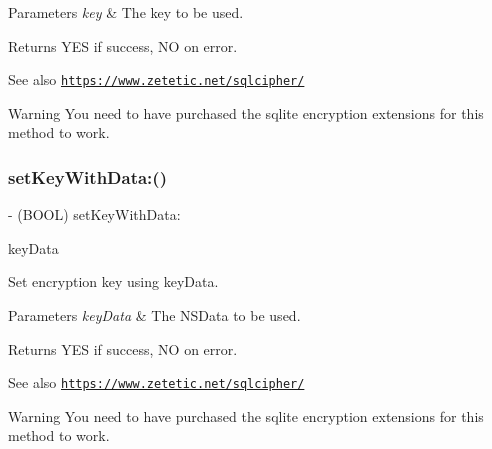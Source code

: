 \begin{DoxyParams}{Parameters}
{\em key} & The key to be used.\\
\hline
\end{DoxyParams}
\begin{DoxyReturn}{Returns}
{\ttfamily Y\+ES} if success, {\ttfamily NO} on error.
\end{DoxyReturn}
\begin{DoxySeeAlso}{See also}
\href{https://www.zetetic.net/sqlcipher/}{\tt https\+://www.\+zetetic.\+net/sqlcipher/}
\end{DoxySeeAlso}
\begin{DoxyWarning}{Warning}
You need to have purchased the sqlite encryption extensions for this method to work. 
\end{DoxyWarning}
\mbox{\label{interface_o_p_t_l_y_f_m_d_b_database_a7cbf561f5cbeae819eefdc0b873f1730}} 
\subsubsection{\texorpdfstring{set\+Key\+With\+Data\+:()}{setKeyWithData:()}}
{\footnotesize\ttfamily -\/ (B\+O\+OL) set\+Key\+With\+Data\+: \begin{DoxyParamCaption}\item[{(N\+S\+Data $\ast$)}]{key\+Data }\end{DoxyParamCaption}}

Set encryption key using {\ttfamily key\+Data}.


\begin{DoxyParams}{Parameters}
{\em key\+Data} & The {\ttfamily N\+S\+Data} to be used.\\
\hline
\end{DoxyParams}
\begin{DoxyReturn}{Returns}
{\ttfamily Y\+ES} if success, {\ttfamily NO} on error.
\end{DoxyReturn}
\begin{DoxySeeAlso}{See also}
\href{https://www.zetetic.net/sqlcipher/}{\tt https\+://www.\+zetetic.\+net/sqlcipher/}
\end{DoxySeeAlso}
\begin{DoxyWarning}{Warning}
You need to have purchased the sqlite encryption extensions for this method to work. 
\end{DoxyWarning}
\mbox{\label{interface_o_p_t_l_y_f_m_d_b_database_af059d6a70119fd76bf338759d92b4a46}} 
